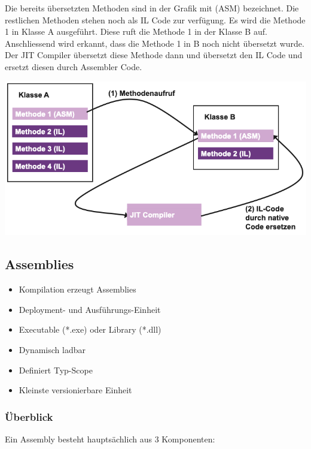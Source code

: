 Die bereits übersetzten Methoden sind in der Grafik mit (ASM) bezeichnet.
Die restlichen Methoden stehen noch als IL Code zur verfügung.
Es wird die Methode 1 in Klasse A ausgeführt.
Diese ruft die Methode 1 in der Klasse B auf.
Anschliessend wird erkannt, dass die Methode 1 in B noch nicht übersetzt wurde.
Der JIT Compiler übersetzt diese Methode dann und übersetzt den IL Code und ersetzt diesen durch Assembler Code.
\begin{center}
\includegraphics[scale=0.28]{graphic/grundlagen/Grundlagen_JIT Compile.png}
\end{center}


\subsection{Assemblies}
\begin{multicols}{2}
\begin{itemize}
    \item Kompilation erzeugt Assemblies
    \item Deployment- und Ausführungs-Einheit
    \item Executable (*.exe) oder Library (*.dll)
    \item Dynamisch ladbar
    \item Definiert Typ-Scope
    \item Kleinste versionierbare Einheit
\end{itemize}
\end{multicols}

\subsubsection{Überblick}
Ein Assembly besteht hauptsächlich aus 3 Komponenten:





